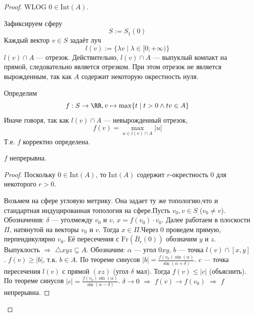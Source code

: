 \documentclass[12pt,a4paper]{article}
\newcommand{\Int}{\ensuremath{\mathrm{Int}}\xspace}
\newcommand{\Fr}{\ensuremath{\mathrm{Fr}}\xspace}
\begin{document}
    \begin{proof}
        WLOG $0 \in \Int(A)$.
        
        Зафиксируем сферу
        \[S := S_1(0)\]
        Каждый вектор $v \in S$ задаёт луч
        \[l(v) := \{\lambda v \mid \lambda \in [0; +\infty)\}\]
        $l(v) \cap A$ --- отрезок. Действительно, $l(v) \cap A$ --- выпуклый компакт на прямой, следовательно является отрезком. При этом отрезок не является вырожденным, так как $A$ содержит некоторую окрестность нуля.

        Определим
        \[f: S \to \RR, v \mapsto \max \{t \mid t > 0 \wedge tv \in A\}\]
        Иначе говоря, так как $l(v) \cap A$ --- невырожденный отрезок,
        \[f(v) = \max_{u \in l(v) \cap A} |u|\]
        Т.е. $f$ корректно определена.

        \begin{thlemma}
            $f$ непрерывна.
        \end{thlemma}

        \begin{proof}
            Поскольку $0 \in \Int(A)$, то $\Int(A)$ содержит $r$-окрестность $0$ для некоторого $r > 0$.

            Возьмем на сфере угловую метрику. Она задает ту же топологию,что и стандартная индуцированная топология на сфере.Пусть $v_0, v \in S$ ($v_0 \neq v$). Обозначения: $\delta$ --- уголмежду $v_0$ и $v$, $x = f(v_0) \cdot v_0$. Далее работаем в плоскости $\Pi$, натянутой на векторы $v_0$ и $v$. Тогда $x \in \Pi$.Через $0$ проведем прямую, перпендикулярно $v_0$. Её пересечения с $\Fr(\overline{B}_r(0))$ обозначим $y$ и $z$. Выпуклость $\Rightarrow$ $\triangle xyz \subseteq A$. Обозначим: $\alpha$ --- угол $0xy$, $b$ --- точка $l(v) \cap [x,y]$. $f(v) \geqslant |b|$, т.к. $b \in A$. По теореме синусов $|b| = \frac{f(v_0) \sin(\alpha)}{\sin(\alpha + \delta)}$. $c$ --- точка пересечения $l(v)$ с прямой $(xz)$ (угол $\delta$ мал). Тогда $f(v) \leqslant |c|$ (объяснить). По теореме синусов $|c| = \frac{f(v_0)\sin(\alpha)}{\sin(\alpha - \delta)}$. $\delta \to 0$ $\Rightarrow$ $f(v) \to f(v_0)$ $\Rightarrow$ $f$ непрерывна.

        \end{proof}


\end{proof}
\end{document}
